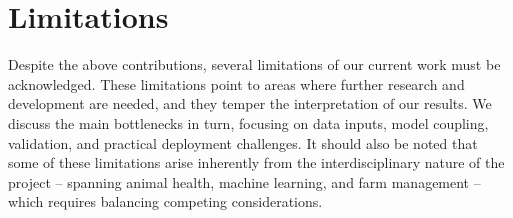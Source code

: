 




\section{Limitations}

Despite the above contributions, several limitations of our current work must be acknowledged. These limitations point to areas where further research and development are needed, and they temper the interpretation of our results. We discuss the main bottlenecks in turn, focusing on data inputs, model coupling, validation, and practical deployment challenges. It should also be noted that some of these limitations arise inherently from the interdisciplinary nature of the project – spanning animal health, machine learning, and farm management – which requires balancing competing considerations.

